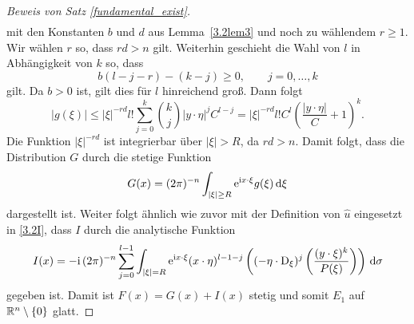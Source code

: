 \begin{proof}[Beweis von Satz \ref{fundamental_exist}]
\begin{equation}
\begin{split}
\end{split}
\end{equation}
mit den Konstanten $b$ und $d$ aus Lemma~\ref{3.2lem3} und noch zu wählendem $r\ge1$. Wir wählen $r$ so, dass $rd>n$ gilt. Weiterhin geschieht die Wahl von $l$ in Abhängigkeit von $k$ so, dass 
\begin{equation}
b(l-j-r) -(k-j) \ge 0,\qquad j=0,\ldots,k
\end{equation}
gilt. Da $b>0$ ist, gilt dies für $l$ hinreichend groß. Dann folgt 
\begin{equation}
|g(\xi)| \le |\xi|^{-rd} l! \sum_{j=0}^k \binom{k}{j} |y\cdot \eta|^j C^{l-j} = | \xi|^{-rd} l! C^l \left ( \frac{|y\cdot\eta|}{C}+1 \right )^k.
\end{equation}
Die Funktion $|\xi|^{-rd}$ ist integrierbar über $|\xi|>R$, da $rd >n$.  Damit folgt, dass die Distribution $G$ durch die stetige Funktion
\begin{equation}
G(x) = (2\pi)^{-n} \int_{|\xi|\ge R}  \mathrm e^{\mathrm i x\cdot \xi} g(\xi)\,\mathrm d \xi
\end{equation}
dargestellt ist. Weiter folgt ähnlich wie zuvor mit der Definition von $\widehat u$ eingesetzt in \eqref{3.2I}, dass $I$ durch die analytische Funktion 
\begin{equation}
I(x) = -\mathrm i\,(2\pi)^{-n} \sum_{j=0}^{l-1} \int_{|\xi|=R}\mathrm e^{\mathrm i x\cdot \xi} (x\cdot \eta)^{l-1-j}  \left ( (-\eta \cdot \mathrm D_\xi)^{j} \left ( \frac{(y\cdot \xi)^k}{P(\xi)} \right ) \right )\,\mathrm d \sigma
\end{equation} 
gegeben ist. Damit ist $F(x)=G(x)+I(x)$ stetig und somit $E_1$ auf $\mathbb R^n\setminus\{0\}$ glatt.
\end{proof}

%
%
%
%

